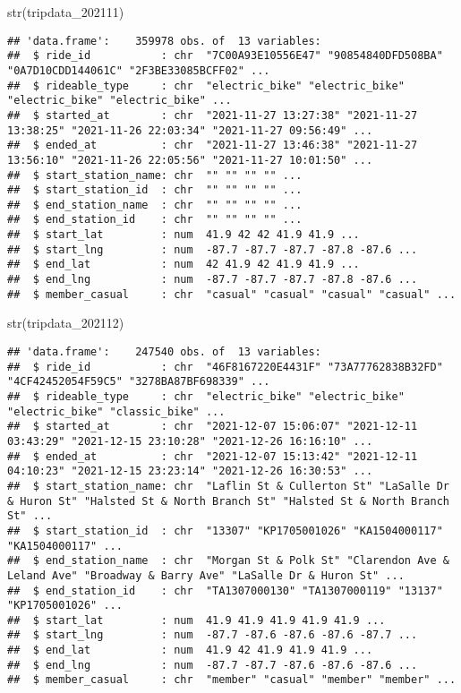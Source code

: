 \documentclass[
]{article}
\newenvironment{Shaded}{\begin{snugshade}}{\end{snugshade}}
\newcommand{\FunctionTok}[1]{\textcolor[rgb]{0.00,0.00,0.00}{#1}}
\newcommand{\NormalTok}[1]{#1}
\begin{document}
\begin{Shaded}
\begin{Highlighting}[]
\FunctionTok{str}\NormalTok{(tripdata\_202111)}
\end{Highlighting}
\end{Shaded}

\begin{verbatim}
## 'data.frame':    359978 obs. of  13 variables:
##  $ ride_id           : chr  "7C00A93E10556E47" "90854840DFD508BA" "0A7D10CDD144061C" "2F3BE33085BCFF02" ...
##  $ rideable_type     : chr  "electric_bike" "electric_bike" "electric_bike" "electric_bike" ...
##  $ started_at        : chr  "2021-11-27 13:27:38" "2021-11-27 13:38:25" "2021-11-26 22:03:34" "2021-11-27 09:56:49" ...
##  $ ended_at          : chr  "2021-11-27 13:46:38" "2021-11-27 13:56:10" "2021-11-26 22:05:56" "2021-11-27 10:01:50" ...
##  $ start_station_name: chr  "" "" "" "" ...
##  $ start_station_id  : chr  "" "" "" "" ...
##  $ end_station_name  : chr  "" "" "" "" ...
##  $ end_station_id    : chr  "" "" "" "" ...
##  $ start_lat         : num  41.9 42 42 41.9 41.9 ...
##  $ start_lng         : num  -87.7 -87.7 -87.7 -87.8 -87.6 ...
##  $ end_lat           : num  42 41.9 42 41.9 41.9 ...
##  $ end_lng           : num  -87.7 -87.7 -87.7 -87.8 -87.6 ...
##  $ member_casual     : chr  "casual" "casual" "casual" "casual" ...
\end{verbatim}

\begin{Shaded}
\begin{Highlighting}[]
\FunctionTok{str}\NormalTok{(tripdata\_202112)}
\end{Highlighting}
\end{Shaded}

\begin{verbatim}
## 'data.frame':    247540 obs. of  13 variables:
##  $ ride_id           : chr  "46F8167220E4431F" "73A77762838B32FD" "4CF42452054F59C5" "3278BA87BF698339" ...
##  $ rideable_type     : chr  "electric_bike" "electric_bike" "electric_bike" "classic_bike" ...
##  $ started_at        : chr  "2021-12-07 15:06:07" "2021-12-11 03:43:29" "2021-12-15 23:10:28" "2021-12-26 16:16:10" ...
##  $ ended_at          : chr  "2021-12-07 15:13:42" "2021-12-11 04:10:23" "2021-12-15 23:23:14" "2021-12-26 16:30:53" ...
##  $ start_station_name: chr  "Laflin St & Cullerton St" "LaSalle Dr & Huron St" "Halsted St & North Branch St" "Halsted St & North Branch St" ...
##  $ start_station_id  : chr  "13307" "KP1705001026" "KA1504000117" "KA1504000117" ...
##  $ end_station_name  : chr  "Morgan St & Polk St" "Clarendon Ave & Leland Ave" "Broadway & Barry Ave" "LaSalle Dr & Huron St" ...
##  $ end_station_id    : chr  "TA1307000130" "TA1307000119" "13137" "KP1705001026" ...
##  $ start_lat         : num  41.9 41.9 41.9 41.9 41.9 ...
##  $ start_lng         : num  -87.7 -87.6 -87.6 -87.6 -87.7 ...
##  $ end_lat           : num  41.9 42 41.9 41.9 41.9 ...
##  $ end_lng           : num  -87.7 -87.7 -87.6 -87.6 -87.6 ...
##  $ member_casual     : chr  "member" "casual" "member" "member" ...
\end{verbatim}
\end{document}
